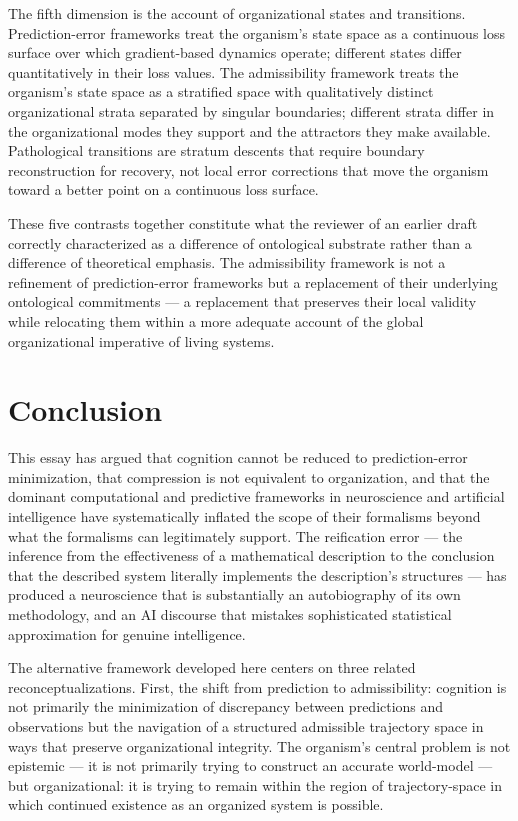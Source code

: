 \documentclass[12pt,a4paper]{report}
\theoremstyle{flyxion}
\begin{document}
The fifth dimension is the account of organizational states and transitions. Prediction-error frameworks treat the organism's state space as a continuous loss surface over which gradient-based dynamics operate; different states differ quantitatively in their loss values. The admissibility framework treats the organism's state space as a stratified space with qualitatively distinct organizational strata separated by singular boundaries; different strata differ in the organizational modes they support and the attractors they make available. Pathological transitions are stratum descents that require boundary reconstruction for recovery, not local error corrections that move the organism toward a better point on a continuous loss surface.

These five contrasts together constitute what the reviewer of an earlier draft correctly characterized as a difference of ontological substrate rather than a difference of theoretical emphasis. The admissibility framework is not a refinement of prediction-error frameworks but a replacement of their underlying ontological commitments --- a replacement that preserves their local validity while relocating them within a more adequate account of the global organizational imperative of living systems.

\chapter*{Conclusion}

This essay has argued that cognition cannot be reduced to prediction-error minimization, that compression is not equivalent to organization, and that the dominant computational and predictive frameworks in neuroscience and artificial intelligence have systematically inflated the scope of their formalisms beyond what the formalisms can legitimately support. The reification error --- the inference from the effectiveness of a mathematical description to the conclusion that the described system literally implements the description's structures --- has produced a neuroscience that is substantially an autobiography of its own methodology, and an AI discourse that mistakes sophisticated statistical approximation for genuine intelligence.

The alternative framework developed here centers on three related reconceptualizations. First, the shift from prediction to admissibility: cognition is not primarily the minimization of discrepancy between predictions and observations but the navigation of a structured admissible trajectory space in ways that preserve organizational integrity. The organism's central problem is not epistemic --- it is not primarily trying to construct an accurate world-model --- but organizational: it is trying to remain within the region of trajectory-space in which continued existence as an organized system is possible.
\end{document}
